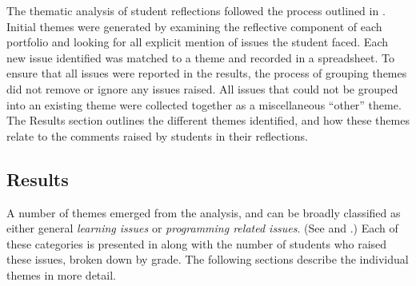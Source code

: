The thematic analysis of student reflections followed the process outlined in . Initial themes were generated by examining the reflective component of each portfolio and looking for all explicit mention of issues the student faced. Each new issue identified was matched to a theme and recorded in a spreadsheet. To ensure that all issues were reported in the results, the process of grouping themes did not remove or ignore any issues raised. All issues that could not be grouped into an existing theme were collected together as a miscellaneous ``other'' theme. The Results section outlines the different themes identified, and how these themes relate to the comments raised by students in their reflections.


\subsection{Results} %
\label{sec:issues_results}

A number of themes emerged from the analysis, and can be broadly classified as either general \emph{learning issues} or \emph{programming related issues}. (See  and .) Each of these categories is presented in  along with the number of students who raised these issues, broken down by grade. The following sections describe the individual themes in more detail.

